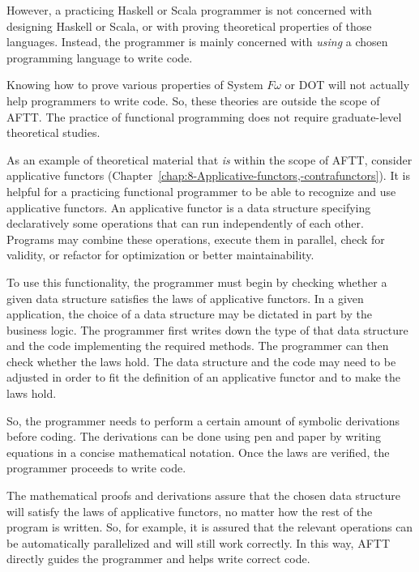 However, a practicing Haskell or Scala programmer is not concerned
with designing Haskell or Scala, or with proving theoretical properties
of those languages. Instead, the programmer is mainly concerned with
\emph{using} a chosen programming language to write code. 

Knowing how to prove various properties of System $F\omega$ or DOT
will not actually help programmers to write code. So, these theories
are outside the scope of AFTT. The practice of functional programming
does not require graduate-level theoretical studies.

As an example of theoretical material that \emph{is} within the scope
of AFTT, consider applicative functors (Chapter~\ref{chap:8-Applicative-functors,-contrafunctors}).
It is helpful for a practicing functional programmer to be able to
recognize and use applicative functors. An applicative functor is
a data structure specifying declaratively some operations that can
run independently of each other. Programs may combine these operations,
execute them in parallel, check for validity, or refactor for optimization
or better maintainability.

To use this functionality, the programmer must begin by checking whether
a given data structure satisfies the laws of applicative functors.
In a given application, the choice of a data structure may be dictated
in part by the business logic. The programmer first writes down the
type of that data structure and the code implementing the required
methods. The programmer can then check whether the laws hold. The
data structure and the code may need to be adjusted in order to fit
the definition of an applicative functor and to make the laws hold.

So, the programmer needs to perform a certain amount of symbolic derivations
before coding. The derivations can be done using pen and paper by
writing equations in a concise mathematical notation. Once the laws
are verified, the programmer proceeds to write code.

The mathematical proofs and derivations assure that the chosen data
structure will satisfy the laws of applicative functors, no matter
how the rest of the program is written. So, for example, it is assured
that the relevant operations can be automatically parallelized and
will still work correctly. In this way, AFTT directly guides the programmer
and helps write correct code.

